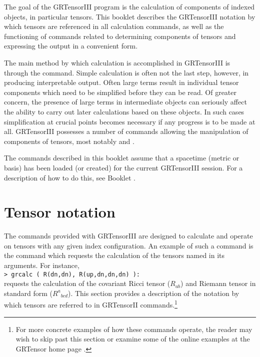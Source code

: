 \documentclass{article}
\begin{document}
\grlabel{\grCalcLabel}
\grtitle{\grCalcTitle}
\grtitlepage
\copyrightpage
\noindent The goal of the GRTensorIII program is the calculation of
components of indexed objects, in particular tensors. This booklet
describes the GRTensorIII notation by which tensors are referenced in
all calculation commands, as well as the functioning of commands
related to determining components of tensors and expressing the output
in a convenient form.

The main method by which calculation is accomplished in GRTensorIII is
through the  command.  Simple calculation is often not
the last step, however, in producing interpretable output. Often large
terms result in individual tensor components which need to be
simplified before they can be read. Of greater concern, the presence
of large terms in intermediate objects can seriously affect the
ability to carry out later calculations based on these objects. In
such cases simplification at crucial points becomes necessary if any
progress is to be made at all. GRTensorIII possesses a number of
commands allowing the manipulation of components of tensors, most
notably  and .

The commands described in this booklet assume that a spacetime (metric
or basis) has been loaded (or created) for the current GRTensorIII session.
For a description of how to do this, see Booklet \grMakegRef.
%
\section{Tensor notation} \label{sec:indices}
%
The commands provided with GRTensorIII are designed to calculate and operate
on tensors with any given index configuration. An example of such a command
is the  command which requests the calculation of the tensors
named in its arguments. For instance,\\

\noindent\texttt{> grcalc ( R(dn,dn), R(up,dn,dn,dn) ):}\\

\noindent requests the calculation of the covariant Ricci tensor ($R_{ab}$)
and Riemann tensor in standard form ($R^a{}_{bcd}$). This section provides
a description of the notation by which tensors are referred to in GRTensorII
commands.\footnote{For more concrete examples of how these commands operate,
the reader may wish to skip past this section or examine some
of the online examples at the GRTensor home page \cite{www}.}
%
\end{document}
